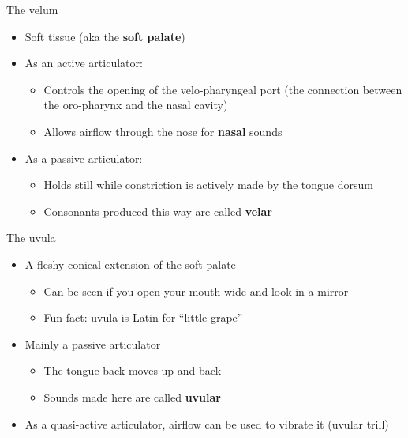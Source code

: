 \documentclass[professionalfonts]{beamer}
\begin{document}
\begin{frame}{The velum}
    \begin{itemize}
        \item Soft tissue (aka the \textbf{soft palate})
        \item As an active articulator:
        \begin{itemize}
            \item Controls the opening of the velo-pharyngeal port (the connection between the oro-pharynx and the nasal cavity)
            \item Allows airflow through the nose for \textbf{nasal} sounds
        \end{itemize}
        \item As a passive articulator:
        \begin{itemize}
            \item Holds still while constriction is actively made by the tongue dorsum
            \item Consonants produced this way are called \textbf{velar}
        \end{itemize}
    \end{itemize}
\end{frame}

\begin{frame}{The uvula}
    \begin{itemize}
        \item A fleshy conical extension of the soft palate
        \begin{itemize}
            \item Can be seen if you open your mouth wide and look in a mirror
            \item Fun fact: uvula is Latin for “little grape”
        \end{itemize}
        \item Mainly a passive articulator
        \begin{itemize}
            \item The tongue back moves up and back
            \item Sounds made here are called \textbf{uvular}
        \end{itemize}
        \item As a quasi-active articulator, airflow can be used to vibrate it (uvular trill)
    \end{itemize}
\end{frame}
\end{document}
